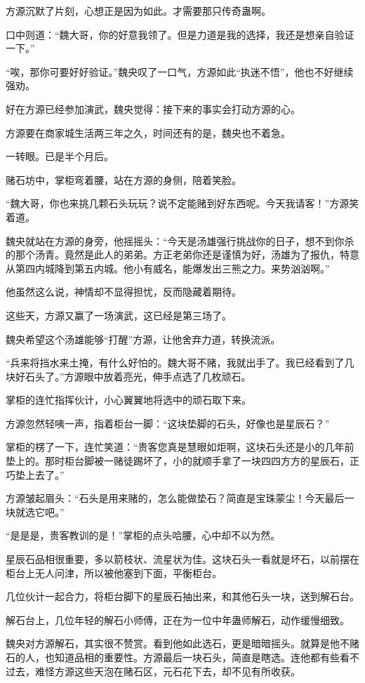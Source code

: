 \begin{this_body}
方源沉默了片刻，心想正是因为如此。才需要那只传奇蛊啊。

口中则道：“魏大哥，你的好意我领了。但是力道是我的选择，我还是想亲自验证一下。”

“唉，那你可要好好验证。”魏央叹了一口气，方源如此“执迷不悟”，他也不好继续强劝。

好在方源已经参加演武，魏央觉得：接下来的事实会打动方源的心。

方源要在商家城生活两三年之久，时间还有的是，魏央也不着急。

一转眼。已是半个月后。

赌石坊中，掌柜弯着腰，站在方源的身侧，陪着笑脸。

“魏大哥，你也来挑几颗石头玩玩？说不定能赌到好东西呢。今天我请客！”方源笑着道。

魏央就站在方源的身旁，他摇摇头：“今天是汤雄强行挑战你的日子，想不到你杀的那个汤青。竟然是此人的弟弟。方正老弟你还是谨慎为好，汤雄为了报仇，特意从第四内城降到第五内城。他小有威名，能爆发出三熊之力。来势汹汹啊。”

他虽然这么说，神情却不显得担忧，反而隐藏着期待。

这些天，方源又赢了一场演武，这已经是第三场了。

魏央希望这个汤雄能够“打醒”方源，让他舍弃力道，转换流派。

“兵来将挡水来土掩，有什么好怕的。魏大哥不赌，我就出手了。我已经看到了几块好石头了。”方源眼中放着亮光，伸手点选了几枚顽石。

掌柜的连忙指挥伙计，小心翼翼地将选中的顽石取下来。

方源忽然轻咦一声，指着柜台一脚：“这块垫脚的石头，好像也是星辰石？”

掌柜的楞了一下，连忙笑道：“贵客您真是慧眼如炬啊，这块石头还是小的几年前垫上的。那时柜台脚被一赌徒踢坏了，小的就顺手拿了一块四四方方的星辰石，正巧垫上去了。”

方源皱起眉头：“石头是用来赌的，怎么能做垫石？简直是宝珠蒙尘！今天最后一块就选它吧。”

“是是是，贵客教训的是！”掌柜的点头哈腰，心中却不以为然。

星辰石品相很重要，多以箭枝状、流星状为佳。这块石头一看就是坏石，以前摆在柜台上无人问津，所以被他塞到下面，平衡柜台。

几位伙计一起合力，将柜台脚下的星辰石抽出来，和其他石头一块，送到解石台。

解石台上，几位年轻的解石小师傅，正在为一位中年蛊师解石，动作缓慢细致。

魏央对方源解石，其实很不赞赏。看到他如此选石，更是暗暗摇头。就算是他不赌石的人，也知道品相的重要性。方源最后一块石头，简直是瞎选。连他都有些看不过去，难怪方源这些天泡在赌石区，元石花下去，却不见有所收获。


\end{this_body}
